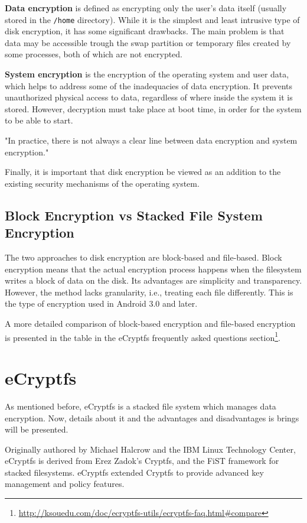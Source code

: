 \textbf{Data encryption} is defined as encrypting only the user's data itself (usually stored in the \texttt{/home} directory). While it is the simplest and least intrusive type of disk encryption, it has some significant drawbacks. The main problem is that data may be accessible trough the swap partition or temporary files created by some processes, both of which are not encrypted.

\textbf{System encryption} is the encryption of the operating system and user data, which helps to address some of the inadequacies of data encryption. It prevents unauthorized physical access to data, regardless of where inside the system it is stored. However, decryption must take place at boot time, in order for the system to be able to start.

"In practice, there is not always a clear line between data encryption and system encryption\cite{disk-enc}."

Finally, it is important that disk encryption be viewed as an addition to the existing security mechanisms of the operating system.

\subsection{Block Encryption vs Stacked File System Encryption}
\label{sub-sec:be-vs-sfse}

The two approaches to disk encryption are block-based and file-based. Block encryption means that the actual encryption process happens when the filesystem writes a block of data on the disk. Its advantages are simplicity and transparency. However, the method lacks granularity, i.e., treating each file differently. This is the type of encryption used in Android 3.0 and later.

A more detailed comparison of block-based encryption and file-based encryption is presented in the table in the eCryptfs frequently asked questions section\footnote{\url{http://ksouedu.com/doc/ecryptfs-utils/ecryptfs-faq.html\#compare}}.

\section{eCryptfs}
\label{sec:de-ecryptfs}

As mentioned before, eCryptfs is a stacked file system which manages data encryption. Now, details about it and the advantages and disadvantages is brings will be presented.

Originally authored by Michael Halcrow and the IBM Linux Technology Center, eCryptfs is derived from Erez Zadok's Cryptfs, and the FiST framework for stacked filesystems. eCryptfs extended Cryptfs to provide advanced key management and policy features\cite{ecryptfs-paper}.

